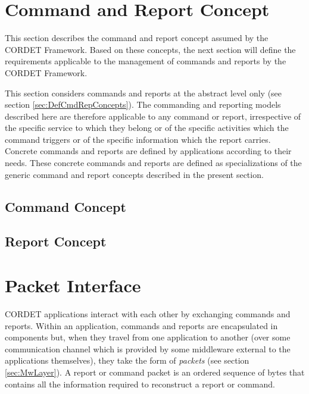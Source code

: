 \documentclass[a4paper,10pt]{article}
\let\stdsection\section
\renewcommand\section{\newpage\stdsection}
\begin{document}
\section{Command and Report Concept}\label{sec:CmdAndRepConcept}
This section describes the command and report concept assumed by the CORDET Framework. 
Based on these concepts, the next section will define the requirements applicable to the management of commands and reports by the CORDET Framework.

This section considers commands and reports at the abstract level only (see section \ref{sec:DefCmdRepConcepts}). 
The commanding and reporting models described here are therefore applicable to any command or report, irrespective of the specific service to which they belong or of the specific activities which the command triggers or of the specific information which the report carries. 
Concrete commands and reports are defined by applications according to their needs. 
These concrete commands and reports are defined as specializations of the generic command and report concepts described in the present section. 

\subsection{Command Concept }\label{sec:CmdConcept}


\subsection{Report Concept }\label{sec:RepConcept}



\clearpage
\section{Packet Interface}\label{sec:PcktInterface}

CORDET applications interact with each other by exchanging commands and reports. Within an application, commands and reports are encapsulated in components but, when they travel from one application to another (over some communication channel which is provided by some middleware external to the applications themselves), they take the form of \textit{packets} (see section \ref{sec:MwLayer}). A report or command packet is an ordered sequence of bytes that contains all the information required to reconstruct a report or command. 
\end{document}
